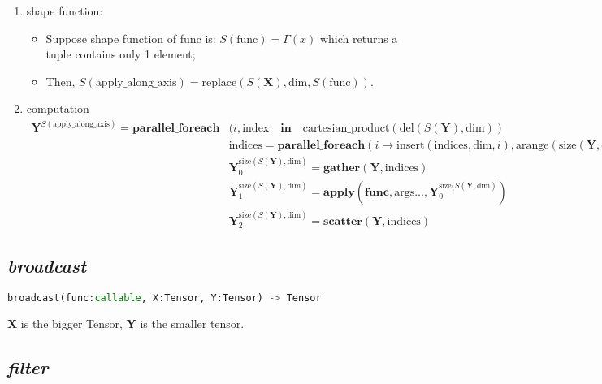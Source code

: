 \begin{enumerate}
  \item shape function:
  \begin{itemize}
    \item Suppose shape function of func is: $S(\text{func}) = \Gamma(x)$ which returns a tuple contains only 1 element;
    \item Then, $S(\text{apply\_along\_axis}) = \text{replace}(S(\mathbf{X}), \text{dim}, S(\text{func}))$.
  \end{itemize}

  \item computation
  \begin{equation*}
    \begin{aligned}
      \mathbf{Y}^{S(\text{apply\_along\_axis})} = \textbf{parallel\_foreach}& (i, \text{index} \quad \textbf{in} \quad \text{cartesian\_product}(\text{del}(S(\mathbf{Y}), \text{dim})) \\
      & \text{indices} = \textbf{parallel\_foreach}(i \rightarrow \text{insert}(\text{indices}, \text{dim}, i), \text{arange}(\text{size}(\mathbf{Y}, \text{dim}))) \\
      & \mathbf{Y}_0^{\text{size}(S(\mathbf{Y}), \text{dim})} = \textbf{gather}(\mathbf{Y}, \text{indices}) \\
      & \mathbf{Y}_1^{\text{size}(S(\mathbf{Y}), \text{dim})} = \textbf{apply}(\textbf{func}, \text{args}..., \mathbf{Y}_0^{\text{size}(S(\mathbf{Y}, \text{dim})}) \\
      & \mathbf{Y}_2^{\text{size}(S(\mathbf{Y}), \text{dim})} = \textbf{scatter}(\mathbf{Y}, \text{indices})
    \end{aligned}
  \end{equation*}
\end{enumerate}

\subsection{\textbf{\textit{broadcast}}}

\begin{lstlisting}[language=Python]
broadcast(func:callable, X:Tensor, Y:Tensor) -> Tensor
\end{lstlisting}

$\mathbf{X}$ is the bigger Tensor, $\mathbf{Y}$ is the smaller tensor.

\subsection{\textbf{\textit{filter}}}
